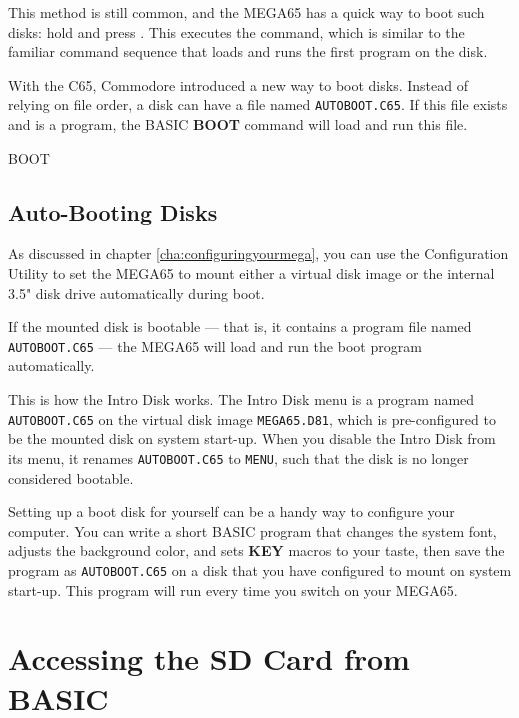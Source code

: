 This method is still common, and the MEGA65 has a quick way to boot such disks: hold  and press . This executes the  command, which is similar to the familiar command sequence that loads and runs the first program on the disk.

With the C65, Commodore introduced a new way to boot disks. Instead of relying on file order, a disk can have a file named {\tt AUTOBOOT.C65}. If this file exists and is a program, the BASIC {\bf BOOT} command will load and run this file.

\begin{screenoutput}
BOOT
\end{screenoutput}

\subsection{Auto-Booting Disks}

As discussed in chapter \vref{cha:configuringyourmega}, you can use the Configuration Utility to set the MEGA65 to mount either a virtual disk image or the internal 3.5" disk drive automatically during boot.

If the mounted disk is bootable --- that is, it contains a program file named {\tt AUTOBOOT.C65} --- the MEGA65 will load and run the boot program automatically.

This is how the Intro Disk works. The Intro Disk menu is a program named {\tt AUTOBOOT.C65} on the virtual disk image {\tt MEGA65.D81}, which is pre-configured to be the mounted disk on system start-up. When you disable the Intro Disk from its menu, it renames {\tt AUTOBOOT.C65} to {\tt MENU}, such that the disk is no longer considered bootable.

Setting up a boot disk for yourself can be a handy way to configure your computer. You can write a short BASIC program that changes the system font, adjusts the background color, and sets {\bf KEY} macros to your taste, then save the program as {\tt AUTOBOOT.C65} on a disk that you have configured to mount on system start-up. This program will run every time you switch on your MEGA65.


\section{Accessing the SD Card from BASIC}

